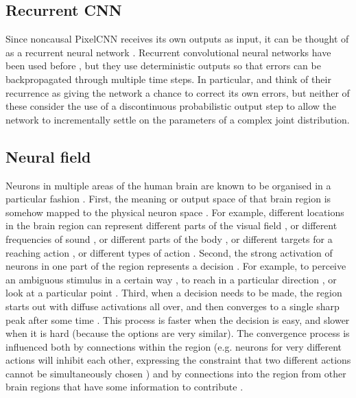 \documentclass[11pt, a4paper, openany]{book}
\begin{document}
\subsection{Recurrent CNN}

Since noncausal PixelCNN receives its own outputs as input, it can be thought of as a recurrent neural network \citep{rnn}. Recurrent convolutional neural networks have been used before \citep{rcnnlabel,rcnnobject,rcnnreinforcement,rcnnsaliency,crfrcnn}, but they use deterministic outputs so that errors can be backpropagated through multiple time steps. In particular, \citet{rcnnlabel} and \citet{rcnnsaliency} think of their recurrence as giving the network a chance to correct its own errors, but neither of these consider the use of a discontinuous probabilistic output step to allow the network to incrementally settle on the parameters of a complex joint distribution.

\subsection{Neural field} \label{neuralfields}

Neurons in multiple areas of the human brain are known to be organised in a particular fashion \citep{douglas2004neuronal}. First, the meaning or output space of that brain region is somehow mapped to the physical neuron space \citep{erlhagen1999distribution,douglas2004neuronal}. For example, different locations in the brain region can represent different parts of the visual field \citep{ellias1975pattern}, or different frequencies of sound \citep{romani1982tonotopic}, or different parts of the body \citep{nakamura1998somatosensory}, or different targets for a reaching action \citep{erlhagen1999distribution,cisek2010neural}, or different types of action \citep{cisek2007cortical}. Second, the strong activation of neurons in one part of the region represents a decision \citep{amari1977dynamics,erlhagen1999distribution,cisek2007cortical}. For example, to perceive an ambiguous stimulus in a certain way \citep{kleinschmidt1998human}, to reach in a particular direction \citep{erlhagen1999distribution,cisek2010neural}, or look at a particular point \citep{kopecz1995saccadic}. Third, when a decision needs to be made, the region starts out with diffuse activations all over, and then converges to a single sharp peak after some time \citep{amari1977dynamics,erlhagen1999distribution,brincat2006dynamic}. This process is faster when the decision is easy, and slower when it is hard \citep{decisions1} (because the options are very similar). The convergence process is influenced both by connections within the region (e.g. neurons for very different actions will inhibit each other, expressing the constraint that two different actions cannot be simultaneously chosen \citep{redgrave1999basal}) and by connections into the region from other brain regions that have some information to contribute \citep{redgrave1999basal}.
\end{document}
